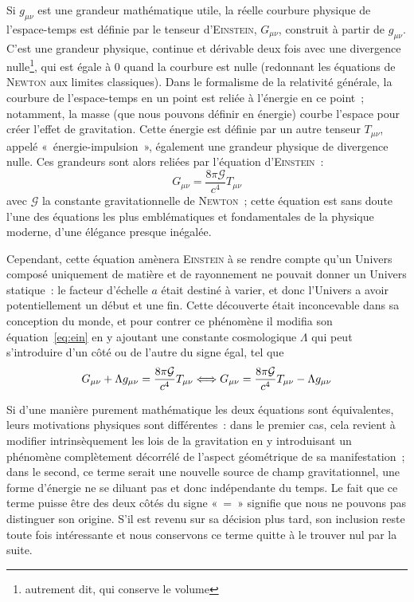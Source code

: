 \documentclass[../main/main.tex]{subfiles}
\begin{document}
Si $g_{\mu\nu}$ est une grandeur mathématique utile, la réelle courbure physique
de l'espace-temps est définie par le tenseur d'\textsc{Einstein}, $G_{\mu\nu}$,
construit à partir de $g_{\mu\nu}$. C'est une grandeur physique, continue et
dérivable deux fois avec une divergence nulle\footnote{autrement dit, qui
conserve le volume}, qui est égale à 0 quand la courbure est nulle (redonnant
les équations de \textsc{Newton} aux limites classiques). Dans le formalisme de
la relativité générale, la courbure de l'espace-temps en un point est reliée à
l'énergie en ce point~; notamment, la masse (que nous pouvons définir en
énergie) courbe l'espace pour créer l'effet de gravitation. Cette énergie est
définie par un autre tenseur $T_{\mu\nu}$, appelé «~énergie-impulsion~»,
également une grandeur physique de divergence nulle. Ces grandeurs sont alors
reliées par l'équation d'\textsc{Einstein}~:
\begin{equation}\label{eq:ein}
    G_{\mu\nu} = \frac{8\pi\mathcal{G}}{c^4}T_{\mu\nu}
\end{equation}
avec $\mathcal{G}$ la constante gravitationnelle de \textsc{Newton}~; cette
équation est sans doute l'une des équations les plus emblématiques et
fondamentales de la physique moderne, d'une élégance presque inégalée.

Cependant, cette équation amènera \textsc{Einstein} à se rendre compte qu'un
Univers composé uniquement de matière et de rayonnement ne pouvait donner un
Univers statique~: le facteur d'échelle $a$ était destiné à varier, et donc
l'Univers a avoir potentiellement un début et une fin. Cette découverte était
inconcevable dans sa conception du monde, et pour contrer ce phénomène il
modifia son équation~\ref{eq:ein} en y ajoutant une constante cosmologique
$\Lambda$ qui peut s'introduire d'un côté ou de l'autre du signe égal, tel que
\begin{equation}\label{eq:einlamb}
    G_{\mu\nu} + \Lambda g_{\mu\nu} = \frac{8\pi\mathcal{G}}{c^4}T_{\mu\nu}
    \Longleftrightarrow
    G_{\mu\nu} = \frac{8\pi\mathcal{G}}{c^4}T_{\mu\nu} - \Lambda g_{\mu\nu} 
\end{equation}

Si d'une manière purement mathématique les deux équations sont équivalentes,
leurs motivations physiques sont différentes~: dans le premier cas, cela revient
à modifier intrinsèquement les lois de la gravitation en y introduisant un
phénomène complètement décorrélé de l'aspect géométrique de sa manifestation~;
dans le second, ce terme serait une nouvelle source de champ gravitationnel, une
forme d'énergie ne se diluant pas et donc indépendante du temps. Le fait que ce
terme puisse être des deux côtés du signe «~=~» signifie que nous ne pouvons pas
distinguer son origine. S'il est revenu sur sa décision plus tard, son inclusion
reste toute fois intéressante et nous conservons ce terme quitte à le trouver
nul par la suite.
\end{document}
